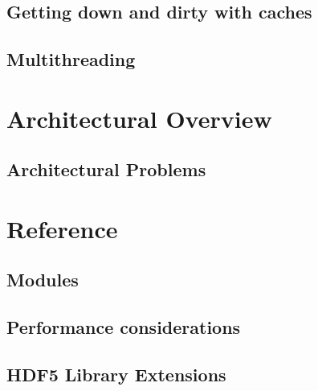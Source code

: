 \documentclass[letterpaper,hyper]{HDF}
\begin{document}
\section{Getting down and dirty with caches}\label{sec:tour6}


%

\section{Multithreading}\label{sec:tour8}


\chapter{Architectural Overview}\label{chap:arch}

\section{Architectural Problems}\label{sec:problems}


\chapter{Reference}\label{part:reference}


\section{Modules}


\section{Performance considerations}


\section{HDF5 Library Extensions}


\end{document}
